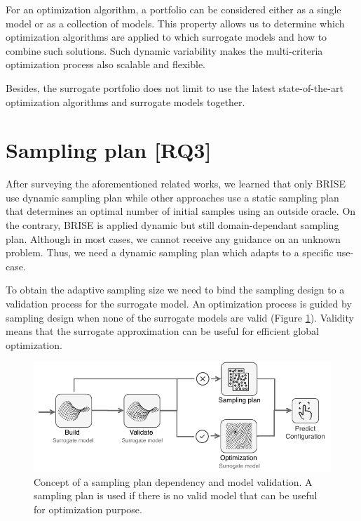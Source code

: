             For an optimization algorithm, a portfolio can be considered either as a single model or as a collection of models. This property allows us to determine which optimization algorithms are applied to which surrogate models and how to combine such solutions. Such dynamic variability makes the multi-criteria optimization process also scalable and flexible.

            Besides, the surrogate portfolio does not limit to use the latest state-of-the-art optimization algorithms and surrogate models together.

    \section{Sampling plan [RQ3]}
        After surveying the aforementioned related works, we learned that only BRISE use dynamic sampling plan while other approaches use a static sampling plan that determines an optimal number of initial samples using an outside oracle. On the contrary, BRISE is applied dynamic but still domain-dependant sampling plan. Although in most cases, we cannot receive any guidance on an unknown problem. 
        Thus, we need a dynamic sampling plan which adapts to a specific use-case.

        To obtain the adaptive sampling size we need to bind the sampling design to a validation process for the surrogate model. An optimization process is guided by sampling design when none of the surrogate models are valid (Figure \ref{fig:concept_sampling}). Validity means that the surrogate approximation can be useful for efficient global optimization.
        \begin{figure}[h]
            \centering
            \includegraphics[width=\textwidth]{content/images/dinamic_sampling_plan}
            \caption[Non-dominated points]{Concept of a sampling plan dependency and model validation. A sampling plan is used if there is no valid model that can be useful for optimization purpose.} 
            \label{fig:concept_sampling} 
        \end{figure}      

